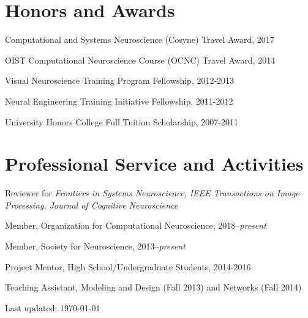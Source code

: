 \documentclass[10pt,letterpaper]{article}
\def\footerlink{} %
\renewenvironment{itemize}{
  \begin{list}{}{
    \setlength{\leftmargin}{1.5em}
    \setlength{\itemsep}{0.25em}
    \setlength{\parskip}{0pt}
    \setlength{\parsep}{0.25em}
  }
}{
  \end{list}
}
\begin{document}
\section*{Honors and Awards}
\vspace{-0.05in}
\begin{itemize}
  \setlength\itemsep{1pt}
  \item Computational and Systems Neuroscience (Cosyne) Travel Award, 2017
  \item OIST Computational Neuroscience Course (OCNC) Travel Award, 2014
  \item Visual Neuroscience Training Program Fellowship, 2012-2013
  \item Neural Engineering Training Initiative Fellowship, 2011-2012
  \item University Honors College Full Tuition Scholarship, 2007-2011
\end{itemize}

\vspace{-0.25in}

\section*{Professional Service and Activities}
\vspace{-0.05in}
\begin{itemize}
  \setlength\itemsep{1pt}
  \item Reviewer for \textit{Frontiers in Systems Neuroscience, IEEE Transactions on Image Processing, Journal of Cognitive Neuroscience}
  \item Member, Organization for Computational Neuroscience, 2018--\textit{present}
  \item Member, Society for Neuroscience, 2013--\textit{present}
  \item Project Mentor, High School/Undergraduate Students, 2014-2016
  \item Teaching Assistant, Modeling and Design (Fall 2013) and Networks (Fall 2014)
\end{itemize}

\bigskip

\begin{center}
  \begin{footnotesize}
    Last updated: \today \\
    \href{\footerlink}{\texttt{\footerlink}}
  \end{footnotesize}
\end{center}
\end{document}
